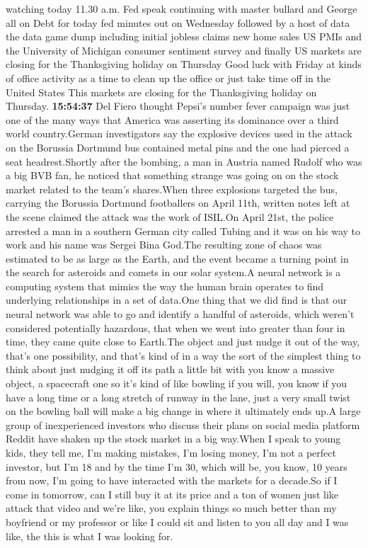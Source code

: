 \documentclass{article}%
\begin{document}
watching today 11.30 a.m. Fed speak continuing with master bullard and George all on Debt for today fed minutes out on Wednesday followed by a host of data the data game dump including initial jobless claims new home sales US PMIs and the University of Michigan consumer sentiment survey and finally US markets are closing for the Thanksgiving holiday on Thursday Good luck with Friday at kinds of office activity as a time to clean up the office or just take time off in the United States  This markets are closing for the Thanksgiving holiday on Thursday.%
\textbf{15:54:37}%
\newline%
Del Fiero thought Pepsi's number fever campaign was just one of the many ways that America was asserting its dominance over a third world country.German investigators say the explosive devices used in the attack on the Borussia Dortmund bus contained metal pins and the one had pierced a seat headrest.Shortly after the bombing, a man in Austria named Rudolf who was a big BVB fan, he noticed that something strange was going on on the stock market related to the team's shares.When three explosions targeted the bus, carrying the Borussia Dortmund footballers on April 11th, written notes left at the scene claimed the attack was the work of ISIL.On April 21st, the police arrested a man in a southern German city called Tubing and it was on his way to work and his name was Sergei Bina God.The resulting zone of chaos was estimated to be as large as the Earth, and the event became a turning point in the search for asteroids and comets in our solar system.A neural network is a computing system that mimics the way the human brain operates to find underlying relationships in a set of data.One thing that we did find is that our neural network was able to go and identify a handful of asteroids, which weren't considered potentially hazardous, that when we went into greater than four in time, they came quite close to Earth.The object and just nudge it out of the way, that's one possibility, and that's kind of in a way the sort of the simplest thing to think about just nudging it off its path a little bit with you know a massive object, a spacecraft one so it's kind of like bowling if you will, you know if you have a long time or a long stretch of runway in the lane, just a very small twist on the bowling ball will make a big change in where it ultimately ends up.A large group of inexperienced investors who discuss their plans on social media platform Reddit have shaken up the stock market in a big way.When I speak to young kids, they tell me, I'm making mistakes, I'm losing money, I'm not a perfect investor, but I'm 18 and by the time I'm 30, which will be, you know, 10 years from now, I'm going to have interacted with the markets for a decade.So if I come in tomorrow, can I still buy it at its price and a ton of women just like attack that video and we're like, you explain things so much better than my boyfriend or my professor or like I could sit and listen to you all day and I was like, the this is what I was looking for.%
\end{document}
